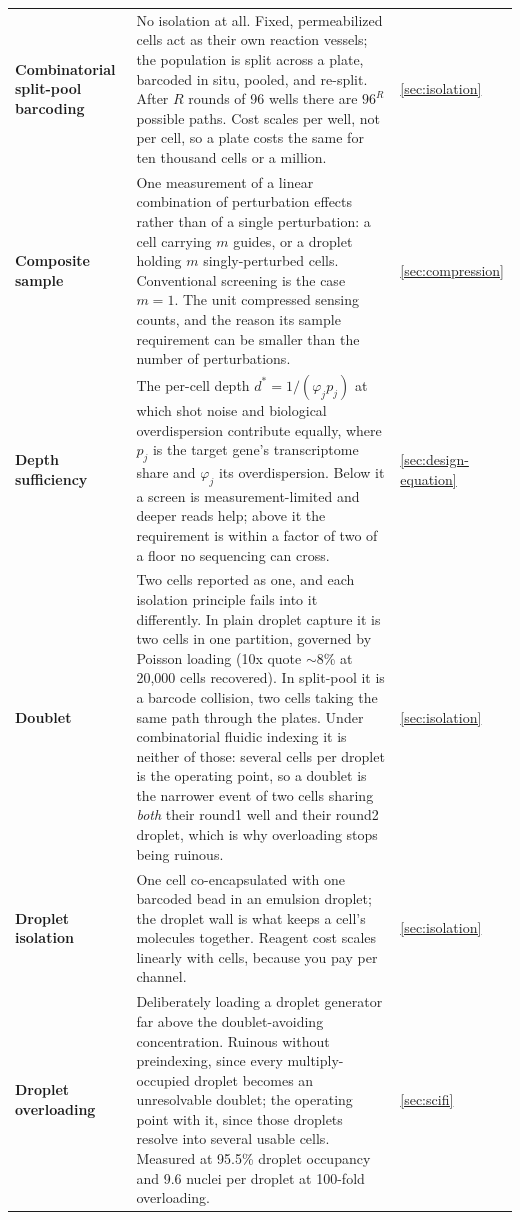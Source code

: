 \begin{longtable}{@{}>{\raggedright\arraybackslash}p{}>{\raggedright\arraybackslash}p{}>{\raggedright\arraybackslash}p{}@{}}
\addlinespace[5pt]
\textbf{Combinatorial split-pool barcoding} & No isolation at all. Fixed, permeabilized cells act as their own reaction vessels; the population is split across a plate, barcoded in situ, pooled, and re-split. After $R$ rounds of 96 wells there are $96^{R}$ possible paths. Cost scales per well, not per cell, so a plate costs the same for ten thousand cells or a million. & \cref{sec:isolation} \\
\addlinespace[5pt]
\textbf{Composite sample} & One measurement of a linear combination of perturbation effects rather than of a single perturbation: a cell carrying $m$ guides, or a droplet holding $m$ singly-perturbed cells. Conventional screening is the case $m=1$. The unit compressed sensing counts, and the reason its sample requirement can be smaller than the number of perturbations. & \cref{sec:compression} \\
\addlinespace[5pt]
\textbf{Depth sufficiency}\newline {\color{tcgray}($d^{*}$)} & The per-cell depth $d^{*}=1/(\varphi_j p_j)$ at which shot noise and biological overdispersion contribute equally, where $p_j$ is the target gene's transcriptome share and $\varphi_j$ its overdispersion. Below it a screen is measurement-limited and deeper reads help; above it the requirement is within a factor of two of a floor no sequencing can cross. & \cref{sec:design-equation} \\
\addlinespace[5pt]
\textbf{Doublet} & Two cells reported as one, and each isolation principle fails into it differently. In plain droplet capture it is two cells in one partition, governed by Poisson loading (10x quote $\sim$8\% at 20{,}000 cells recovered). In split-pool it is a barcode collision, two cells taking the same path through the plates. Under combinatorial fluidic indexing it is neither of those: several cells per droplet is the operating point, so a doublet is the narrower event of two cells sharing \emph{both} their round1 well and their round2 droplet, which is why overloading stops being ruinous. & \cref{sec:isolation} \\
\addlinespace[5pt]
\textbf{Droplet isolation} & One cell co-encapsulated with one barcoded bead in an emulsion droplet; the droplet wall is what keeps a cell's molecules together. Reagent cost scales linearly with cells, because you pay per channel. & \cref{sec:isolation} \\
\addlinespace[5pt]
\textbf{Droplet overloading} & Deliberately loading a droplet generator far above the doublet-avoiding concentration. Ruinous without preindexing, since every multiply-occupied droplet becomes an unresolvable doublet; the operating point with it, since those droplets resolve into several usable cells. Measured at 95.5\% droplet occupancy and 9.6 nuclei per droplet at 100-fold overloading.~\citep{datlingerUltrahighthroughputSinglecellRNA2021} & \cref{sec:scifi} \\

\end{longtable}
